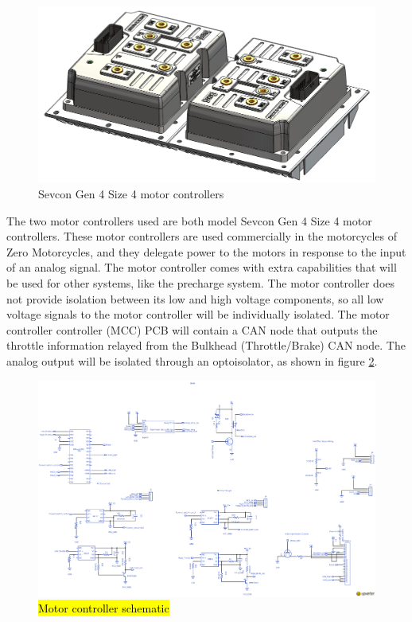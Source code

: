 \documentclass{article}
\DeclareRobustCommand{\hlr}[1]{{\sethlcolor{red}\hl{#1}}}
\begin{document}
            \begin{figure}[H]
                \centering
                \includegraphics[width = 0.7 \textwidth]{motorcontrollers_separate}
                \caption{Sevcon Gen 4 Size 4 motor controllers}
                \label{mcoffcar}
            \end{figure}

            The two motor controllers used are both model Sevcon Gen 4 Size 4 motor controllers. These motor controllers are used commercially in the motorcycles of Zero Motorcycles, and they delegate power to the motors in response to the input of an analog signal. The motor controller comes with extra capabilities that will be used for other systems, like the precharge system. The motor controller does not provide isolation between its low and high voltage components, so all low voltage signals to the motor controller will be individually isolated. The motor controller controller (MCC) PCB will contain a CAN node that outputs the throttle information relayed from the Bulkhead (Throttle/Brake) CAN node. The analog output will be isolated through an optoisolator, as shown in figure \ref{mccschem}.

            \begin{figure}[H]
             \centering
             \includegraphics[width = 0.85 \textwidth]{mccschem}
             \caption{\hlr{Motor controller schematic}}
             \label{mccschem}
            \end{figure}
\end{document}
